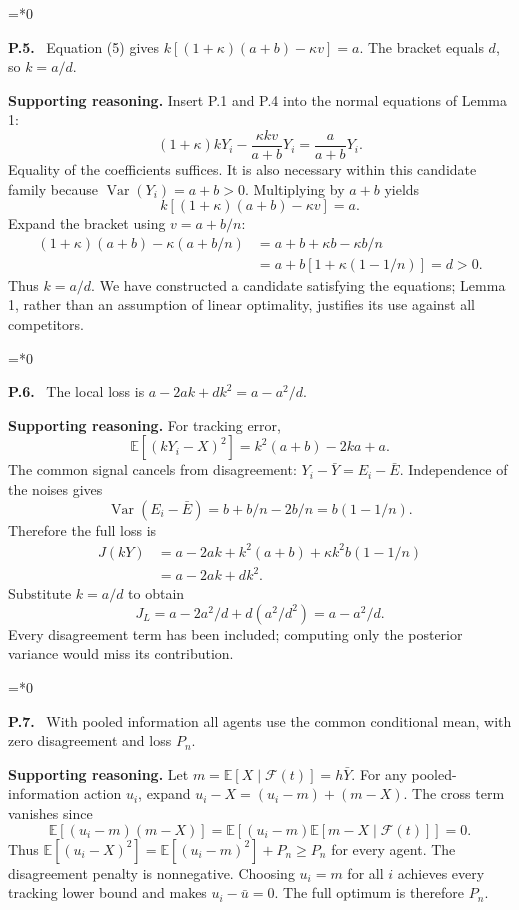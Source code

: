 \documentclass[12pt,letterpaper]{article}
\newcommand{\E}{\mathbb E}
\newcommand{\Var}{\operatorname{Var}}
\newcommand{\F}{\mathcal F}
\newenvironment{proofstep}[2]{%
  \begin{list}{}{\leftmargin=\dimexpr 0.17in*#2\relax%
  \setlength{\rightmargin}{0pt}\setlength{\topsep}{5pt}\setlength{\parsep}{2pt}}%
  \item[]\textbf{\textcolor{ink}{#1.}}\ }{\end{list}}
\begin{document}
\begin{proofstep}{P.5}{0}
\label{step:P.5}
Equation (5) gives $k[(1+\kappa)(a+b)-\kappa v]=a$. The bracket equals $d$, so $k=a/d$.

\textbf{Supporting reasoning.}
Insert P.1 and P.4 into the normal equations of Lemma 1:
\[
(1+\kappa)kY_i-\frac{\kappa kv}{a+b}Y_i
=\frac{a}{a+b}Y_i.
\]
Equality of the coefficients suffices. It is also necessary within this candidate family because $\Var(Y_i)=a+b>0$. Multiplying by $a+b$ yields
\[
k[(1+\kappa)(a+b)-\kappa v]=a.
\]
Expand the bracket using $v=a+b/n$:
\begin{align*}
(1+\kappa)(a+b)-\kappa(a+b/n)
&=a+b+\kappa b-\kappa b/n\\
&=a+b[1+\kappa(1-1/n)]=d>0.
\end{align*}
Thus $k=a/d$. We have constructed a candidate satisfying the equations; Lemma 1, rather than an assumption of linear optimality, justifies its use against all competitors.
\par{}
\end{proofstep}

\begin{proofstep}{P.6}{0}
\label{step:P.6}
The local loss is $a-2ak+dk^2=a-a^2/d$.

\textbf{Supporting reasoning.}
For tracking error,
\[
\E[(kY_i-X)^2]=k^2(a+b)-2ka+a.
\]
The common signal cancels from disagreement: $Y_i-\bar Y=E_i-\bar E$. Independence of the noises gives
\[
\Var(E_i-\bar E)=b+b/n-2b/n=b(1-1/n).
\]
Therefore the full loss is
\begin{align*}
J(kY)&=a-2ak+k^2(a+b)+\kappa k^2b(1-1/n)\\
&=a-2ak+dk^2.
\end{align*}
Substitute $k=a/d$ to obtain
\[
J_L=a-2a^2/d+d(a^2/d^2)=a-a^2/d.
\]
Every disagreement term has been included; computing only the posterior variance would miss its contribution.
\par{}
\end{proofstep}

\begin{proofstep}{P.7}{0}
\label{step:P.7}
With pooled information all agents use the common conditional mean, with zero disagreement and loss $P_n$.

\textbf{Supporting reasoning.}
Let $m=\E[X\mid\F(t)]=h\bar Y$. For any pooled-information action $u_i$, expand $u_i-X=(u_i-m)+(m-X)$. The cross term vanishes since
\[
\E[(u_i-m)(m-X)]=\E[(u_i-m)\E[m-X\mid\F(t)]]=0.
\]
Thus $\E[(u_i-X)^2]=\E[(u_i-m)^2]+P_n\ge P_n$ for every agent. The disagreement penalty is nonnegative. Choosing $u_i=m$ for all $i$ achieves every tracking lower bound and makes $u_i-\bar u=0$. The full optimum is therefore $P_n$.
\par{}
\end{proofstep}
\end{document}
